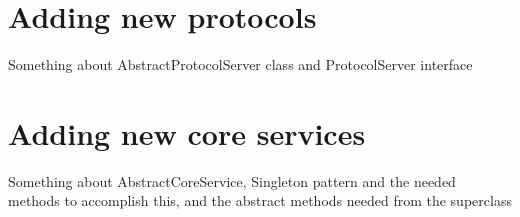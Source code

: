 \section{Adding new protocols}

Something about AbstractProtocolServer class and ProtocolServer interface

\section{Adding new core services}

Something about AbstractCoreService, Singleton pattern and the needed methods to accomplish this, and the abstract methods needed from the superclass


\clearpage